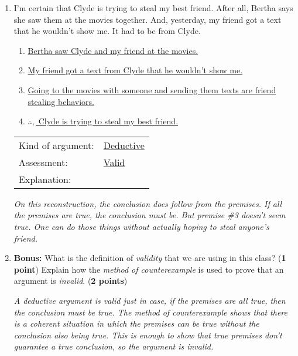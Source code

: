 \documentclass[10pt]{article}
\begin{document}
\begin{enumerate}
\vspace{.9in}
  
  \item I'm certain that Clyde is trying to steal my best friend.  After all, Bertha says she saw them at the movies together.  And, yesterday, my friend got a text that he wouldn't show me.  It had to be from Clyde.

  \begin{enumerate}[1.]
    \item \underline{Bertha saw Clyde and my friend at the movies.}
    \item \underline{My friend got a text from Clyde that he wouldn't show me.}
    \item \underline{Going to the movies with someone and sending them texts are friend stealing behaviors.}
    \item \underline{$\therefore,$ Clyde is trying to steal my best friend.}
  \end{enumerate}
  
  \begin{tabular}{ll}
    Kind of argument: & \underline{Deductive} \\
    Assessment: & \underline{Valid} \\
    Explanation: &  \\
  \end{tabular}
  
  \textit{On this reconstruction, the conclusion does follow from the premises.  If all the premises are true, the conclusion must be.  But premise \#3 doesn't seem true.  One can do those things without actually hoping to steal anyone's friend.}
  
\vspace{1in}  
  
  \item \textbf{Bonus:} What is the definition of \textit{validity} that we are using in this class? (\textbf{1 point}) Explain how the \textit{method of counterexample} is used to prove that an argument is \textit{invalid}. (\textbf{2 points})
  
  \textit{A deductive argument is valid just in case, if the premises are all true, then the conclusion must be true.  The method of counterexample shows that there is a coherent situation in which the premises can be true without the conclusion also being true.  This is enough to show that true premises don't guarantee a true conclusion, so the argument is invalid.}

\end{enumerate}
\end{document}
